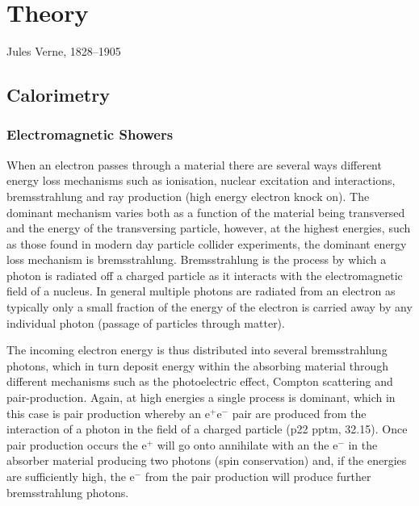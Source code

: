 \chapter{Theory}
\label{chap:theory}

{Jules Verne, 1828--1905}

\section{Calorimetry}

\subsection{Electromagnetic Showers}
When an electron passes through a material there are several ways different energy loss mechanisms such as ionisation, nuclear excitation and interactions, bremsstrahlung and \delta ray production (high energy electron knock on).  The dominant mechanism varies both as a function of the material being transversed and the energy of the transversing particle, however, at the highest energies, such as those found in modern day particle collider experiments, the dominant energy loss mechanism is bremsstrahlung.  Bremsstrahlung is the process by which a photon is radiated off a charged particle as it interacts with the electromagnetic field of a nucleus.  In general multiple photons are radiated from an electron as typically only a small fraction of the energy of the electron is carried away by any individual photon (passage of particles through matter). 

The incoming electron energy is thus distributed into several bremsstrahlung photons, which in turn deposit energy within the absorbing material through different mechanisms such as the photoelectric effect, Compton scattering and pair-production.  Again, at high energies a single process is dominant, which in this case is pair production whereby an $\text{e}^{+}\text{e}^{-}$ pair are produced from the interaction of a photon in the field of a charged particle (p22 pptm, 32.15).  Once pair production occurs the $\text{e}^{+}$ will go onto annihilate with an the $\text{e}^{-}$ in the absorber material producing two photons (spin conservation) and, if the energies are sufficiently high, the $\text{e}^{-}$ from the pair production will produce further bremsstrahlung photons.  

